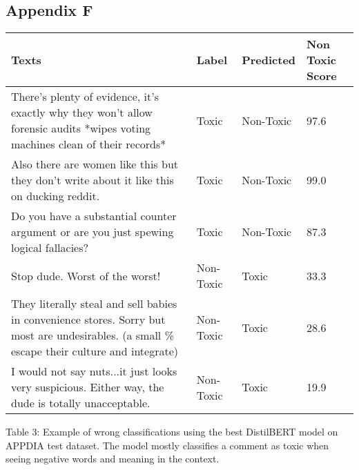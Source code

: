 \documentclass[11pt]{article}
\begin{document}
\subsection{Appendix F}
\begin{table*}[ht]
\centering
\small
\begin{tabularx}{\textwidth}{X|l|l|l}
 \hline
 Texts& Label &Predicted &Non Toxic Score\\
 \hline
 There’s plenty of evidence, it’s exactly why they won’t allow forensic audits   *wipes voting machines clean of their records*   & Toxic    &Non-Toxic &97.6\\
 Also there are women like this but they don’t write about it like this on ducking reddit.&   Toxic  & Non-Toxic   &99.0\\
 Do you have a substantial counter argument or are you just spewing logical fallacies? &Toxic & Non-Toxic &  87.3\\
 Stop dude. Worst of the worst!    &Non-Toxic & Toxic & 33.3\\
 They literally steal and sell babies in convenience stores. Sorry but most are undesirables. (a small \% escape their culture and integrate) &Non-Toxic  &Toxic &28.6\\
 I would not say nuts...it just looks very suspicious. Either way, the dude is totally unacceptable. & Non-Toxic  & Toxic   &19.9\\
 \hline
\end{tabularx}
Table 3: Example of wrong classifications using the best DistilBERT model on APPDIA test dataset. The model mostly classifies a comment as toxic when seeing negative words and meaning in the context.
\end{table*}
\end{document}
